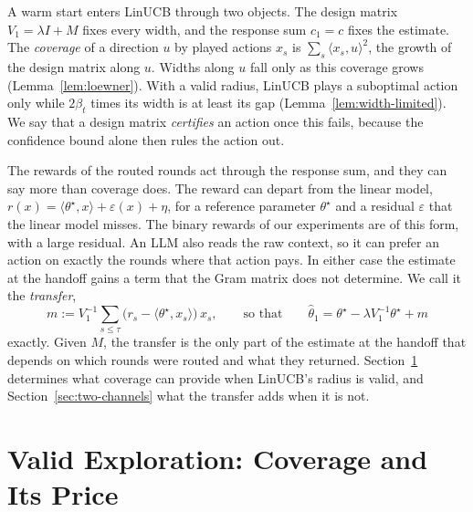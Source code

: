 \documentclass[anon]{alt2027} %
\newif\ifrevmarks\revmarkstrue
\newenvironment{revised}{\ifrevmarks\color{revcolor}\fi}{}
\begin{document}
\begin{revised}
A warm start enters LinUCB through two objects. The design matrix
$V_1=\lambda I+M$ fixes every width, and the response sum $c_1=c$ fixes the
estimate. The \emph{coverage} of a direction $u$ by played actions $x_s$ is
$\sum_s\langle x_s,u\rangle^2$, the growth of the design matrix along $u$.
Widths along $u$ fall only as this coverage grows
(Lemma~\ref{lem:loewner}). With a valid radius, LinUCB plays a suboptimal
action only while $2\beta_t$ times its width is at least its gap
(Lemma~\ref{lem:width-limited}). We say that a design matrix
\emph{certifies} an action once this fails, because the confidence bound
alone then rules the action out.

The rewards of the routed rounds act through the response sum, and they can
say more than coverage does. The reward can depart from the linear model,
$r(x)=\langle\theta^\star,x\rangle+\varepsilon(x)+\eta$, for a reference
parameter $\theta^\star$ and a residual $\varepsilon$ that the linear model
misses. The binary rewards of our experiments are of this form, with a large
residual. An LLM also reads the raw context, so it can prefer an action on
exactly the rounds where that action pays. In either case the estimate at
the handoff gains a term that the Gram matrix does not determine. We call it
the \emph{transfer},
\begin{equation}
\label{eq:transfer}
m:=V_1^{-1}\sum_{s\le\tau}\bigl(r_s-\langle\theta^\star,x_s\rangle\bigr)\,x_s,
\qquad\text{so that}\qquad
\widehat\theta_1=\theta^\star-\lambda V_1^{-1}\theta^\star+m
\end{equation}
exactly. Given $M$, the transfer is the only part of the estimate at the
handoff that depends on which rounds were routed and what they returned.
Section~\ref{sec:price} determines what coverage can provide when LinUCB's
radius is valid, and Section~\ref{sec:two-channels} what the transfer adds
when it is not.
\end{revised}

\section{Valid Exploration: Coverage and Its Price}
\label{sec:price}
\end{document}
